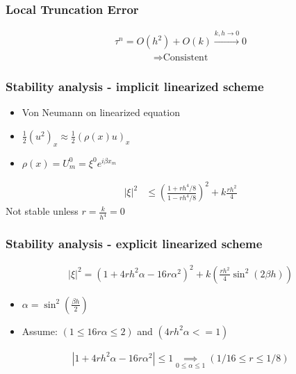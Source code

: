 \documentclass[screen]{beamer}
\begin{document}
\begin{frame}

\frametitle{Local Truncation Error}

\begin{align*}
\tau ^n = O(h^2) + O(k) \xrightarrow{k,h \to 0} 0
\end{align*}
\begin{align*}
\Rightarrow \textrm{Consistent}
\end{align*}

\end{frame}


\begin{frame}

\frametitle{Stability analysis - implicit linearized scheme}
\begin{itemize}
\item Von Neumann on linearized equation \\
\item $\frac{1}{2}(u^2)_x \approx \frac{1}{2}(\rho(x)u)_x$ \\
\item $\rho(x) = U^0_m = \xi^0 e^{i\beta x_m}$ 
\end{itemize}


\begin{align*}
|\xi |^2 &\le \left(\frac{1+rh^4/8}{1-rh^4/8}\right)^2 + k\frac{rh^2}{4}
\end{align*}
Not stable unless $r = \frac{k}{h^4}= 0$

\end{frame}


\begin{frame}
\frametitle{Stability analysis - explicit linearized scheme}
\begin{align*}
|\xi |^2 =  \left(1+4rh^2\alpha-16r\alpha^2\right)^2 + k\left(\frac{rh^2}{4}\sin^2(2\beta h)\right)
\end{align*}

\begin{itemize}
\item $\alpha = \sin^2(\frac{\beta h}{2})$
\item Assume: $(1 \le 16r\alpha \le 2)$ and $(4rh^2\alpha <= 1)$
\end{itemize}

\begin{align*}
 \left| 1+4rh^2\alpha -16r\alpha^2\right| \le 1 \underset{0\le \alpha\le 1}{\implies} \left(1/16 \le r \le 1/8 \right)
\end{align*} 

\end{frame}
\end{document}

